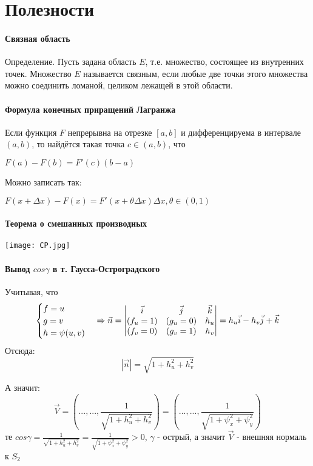 \documentclass[12pt]{article}
\begin{document}
\newpage
\part{Полезности}
\subsection{Связная область}\label{eq4}
Определение. Пусть задана область $E$, т.е. множество, состоящее из внутренних точек. Множество $E$ называется связным, если любые две точки этого
множества можно соединить ломаной, целиком лежащей в этой области.

\subsection{Формула конечных приращений Лагранжа}\label{eq5}	
Если функция $F$ непрерывна на отрезке $[a,b]$  и дифференцируема в интервале $(a,b)$, то найдётся такая точка $ c\in (a,b)$, что
 
	$F(a) - F(b) = F'(c)(b - a)$
	
	Можно записать так:
	
	$F(x + \Delta x) - F(x) = F'(x + \theta\Delta x)\Delta x , \theta \in (0,1) $

\subsection{Теорема о смешанных производных}\label{eq6}
\texttt{[image: CP.jpg]}	

\subsection{Вывод $cos\gamma$ в т. Гаусса-Остроградского}\label{eq10}
Учитывая, что 
$$
\begin{cases}
   f = u \\
   g = v \\
   h = \psi(u,v)
\end{cases}
\Rightarrow
\vec{n} = 
\begin{vmatrix}
\vec{i} & \vec{j} & \vec{k} \\
(f_u = 1) & (g_u = 0) & h_u \\
(f_v = 0) & (g_v = 1) & h_v 
\end{vmatrix}
=
\-h_u \vec{i} - h_v \vec{j} + \vec{k}
$$
Отсюда:
$$
|\vec{n}| = \sqrt{1+h_u^2 + h_v^2}
$$

А значит:
$$
\vec{V} = ( ..., ... , \frac{1}{\sqrt{1+h_u^2 + h_v^2}})
=
( ..., ... , \frac{1}{\sqrt{1+\psi_x^2 + \psi_y^2}})
$$
те $cos\gamma = \frac{1}{\sqrt{1+h_u^2 + h_v^2}} = \frac{1}{\sqrt{1+\psi_x^2 + \psi_y^2}}> 0$, $\gamma$ - острый, а значит $\vec{V}$ - внешняя нормаль к $S_2$
\end{document}
